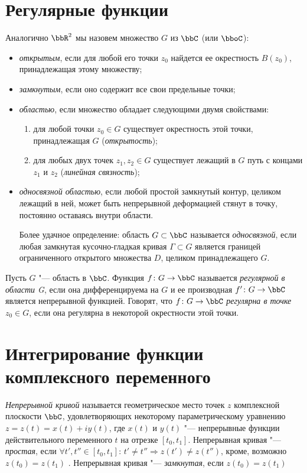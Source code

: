 \section{Регулярные функции}
Аналогично $\bbR^2$ мы назовем множество $G$ из $\bbC$ (или $\bboC$):
\begin{itemize}
\item
\textit{открытым}, если для любой его точки $z_0$ найдется ее окрестность $B(z_0)$, принадлежащая этому множеству;
\item
\textit{замкнутым}, если оно содержит все свои предельные точки;
\item 
\textit{областью}, если множество обладает следующими двумя свойствами:
\begin{enumerate}
\item 
для любой точки $z_0 \in G$ существует окрестность этой точки, принадлежащая $G$ (\textit{открытость});
\item 
для любых двух точек $z_1,z_2 \in G$ существует лежащий в $G$ путь с концами $z_1$ и $z_2$ (\textit{линейная связность});
\end{enumerate}
\item
\textit{односвязной областью}, если любой простой замкнутый контур, целиком лежащий в ней, может быть непрерывной деформацией стянут в точку, постоянно оставаясь внутри области. 

Более удачное определение: область $G\subset \bbC$ называется \textit{односвязной}, если любая замкнутая кусочно-гладкая кривая $\Gamma \subset G$ является границей ограниченного открытого множества $D$, целиком принадлежащего $G$.
\end{itemize}

\begin{defn}
Пусть $G$ "--- область в $\bbC$. Функция $f\colon G \to \bbC$ называется \textit{регулярной в области G}, если она дифференцируема на $G$ и ее производная $f' \colon G \to \bbC$ является непрерывной функцией. Говорят, что $f \colon G \to \bbC$ \textit{регулярна в точке} $z_0 \in G$, если она регулярна в некоторой окрестности этой точки. 
\end{defn}

\section{Интегрирование функции комплексного переменного}
\begin{defn}
\textit{Непрерывной кривой} называется геометрическое место точек $z$ комплексной плоскости $\bbC$, удовлетворяющих некоторому параметрическому уравнению $z=z(t) = x(t) + iy(t)$, где $x(t)$ и $y(t)$ "--- непрерывные функции действительного переменного $t$ на отрезке $[t_0,t_1]$. Непрерывная кривая "--- \textit{простая}, если $\forall t',t'' \in [t_0,t_1]$: $t'\ne t'' \Rightarrow z(t') \ne z(t'')  $, кроме, возможно $z(t_0) = z(t_1)$ . Непрерывная кривая "--- \textit{замкнутая}, если  $z(t_0) = z(t_1)$ 
\end{defn}


